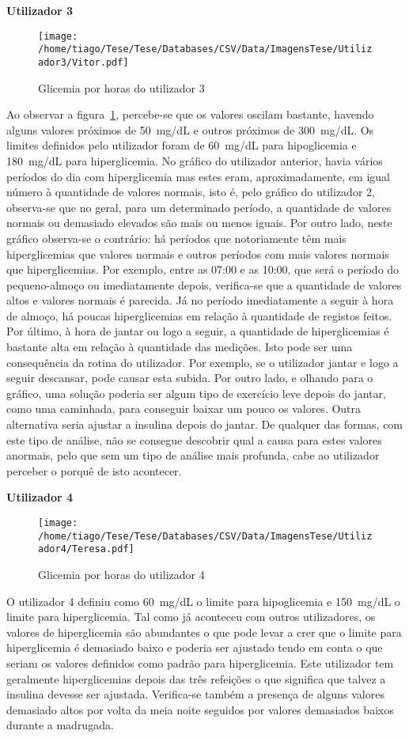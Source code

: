 \textbf{Utilizador 3}


\begin{figure}[H]
\centering
\texttt{[image: /home/tiago/Tese/Tese/Databases/CSV/Data/ImagensTese/Utilizador3/Vitor.pdf]}
\caption{Glicemia por horas do utilizador 3}
\label{fig:uti3}
\end{figure}
Ao observar a figura~\ref{fig:uti3}, percebe-se que os valores oscilam bastante, havendo alguns valores próximos de 50~mg/dL e outros próximos de 300~mg/dL. Os limites definidos pelo utilizador foram de 60~mg/dL para hipoglicemia e 180~mg/dL para hiperglicemia. No gráfico do utilizador anterior, havia vários períodos do dia com hiperglicemia mas estes eram, aproximadamente, em igual número à quantidade de valores normais, isto é, pelo gráfico do utilizador 2, observa-se que no geral, para um determinado período, a quantidade de valores normais ou demasiado elevados são mais ou menos iguais. Por outro lado, neste gráfico observa-se o contrário: há períodos que notoriamente têm mais hiperglicemias que valores normais e outros períodos com mais valores normais que hiperglicemias. 
Por exemplo, entre as 07:00 e as 10:00, que será o período do pequeno-almoço ou imediatamente depois, verifica-se que a quantidade de valores altos e valores normais é parecida. Já no período imediatamente a seguir à hora de almoço, há poucas hiperglicemias em relação à quantidade de registos feitos. Por último, à hora de jantar ou logo a seguir, a quantidade de hiperglicemias é bastante alta em relação à quantidade das medições. Isto pode ser uma consequência da rotina do utilizador. Por exemplo, se o utilizador jantar e logo a seguir descansar, pode causar esta subida. Por outro lado, e olhando para o gráfico, uma solução poderia ser algum tipo de exercício leve depois do jantar, como uma caminhada, para conseguir baixar um pouco os valores. Outra alternativa seria ajustar a insulina depois do jantar. 
De qualquer das formas, com este tipo de análise, não se consegue descobrir qual a causa para estes valores anormais, pelo que sem um tipo de análise mais profunda, cabe ao utilizador perceber o porquê de isto acontecer.\newpage



\textbf{Utilizador 4}


\begin{figure}[H]
\centering
\texttt{[image: /home/tiago/Tese/Tese/Databases/CSV/Data/ImagensTese/Utilizador4/Teresa.pdf]}
\caption{Glicemia por horas do utilizador 4}
\label{fig:uti4}
\end{figure}
O utilizador 4 definiu como 60~mg/dL o limite para hipoglicemia e 150~mg/dL o limite para hiperglicemia. Tal como já aconteceu com outros utilizadores, os valores de hiperglicemia são abundantes o que pode levar a crer que o limite para hiperglicemia é demasiado baixo e poderia ser ajustado tendo em conta o que seriam os valores definidos como padrão para hiperglicemia. Este utilizador tem geralmente hiperglicemias depois das três refeições o que significa que talvez a insulina devesse ser ajustada. Verifica-se também a presença de alguns valores demasiado altos por volta da meia noite seguidos por valores demasiados baixos durante a madrugada.\newpage 


